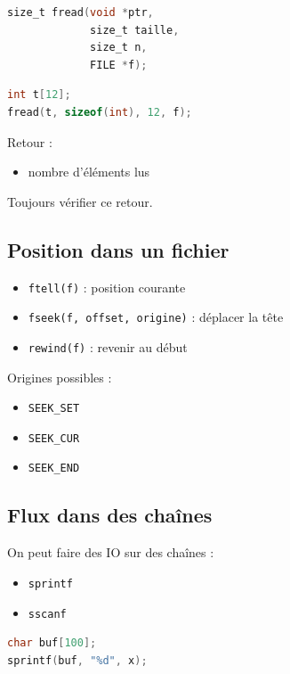\begin{lstlisting}[language=C]
size_t fread(void *ptr,
             size_t taille,
             size_t n,
             FILE *f);
\end{lstlisting}

\begin{lstlisting}[language=C]
int t[12];
fread(t, sizeof(int), 12, f);
\end{lstlisting}

Retour :

\begin{itemize}
    \item nombre d’éléments lus
\end{itemize}

Toujours vérifier ce retour.

\subsection{Position dans un fichier}

\begin{itemize}
    \item \texttt{ftell(f)} : position courante
    \item \texttt{fseek(f, offset, origine)} : déplacer la tête
    \item \texttt{rewind(f)} : revenir au début
\end{itemize}

Origines possibles :

\begin{itemize}
    \item \texttt{SEEK\_SET}
    \item \texttt{SEEK\_CUR}
    \item \texttt{SEEK\_END}
\end{itemize}

\subsection{Flux dans des chaînes}

On peut faire des IO sur des chaînes :

\begin{itemize}
    \item \texttt{sprintf}
    \item \texttt{sscanf}
\end{itemize}

\begin{lstlisting}[language=C]
char buf[100];
sprintf(buf, "%d", x);
\end{lstlisting}

